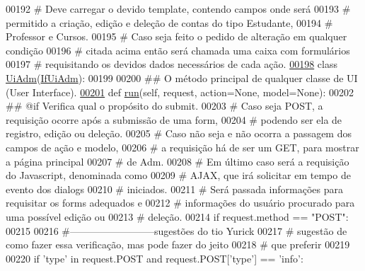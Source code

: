 \begin{DoxyCode}
00192 \textcolor{comment}{#   Deve carregar o devido template, contendo campos onde será}
00193 \textcolor{comment}{#   permitido a criação, edição e deleção de contas do tipo Estudante,}
00194 \textcolor{comment}{#   Professor e Cursos.}
00195 \textcolor{comment}{#   Caso seja feito o pedido de alteração em qualquer condição}
00196 \textcolor{comment}{#   citada acima então será chamada uma caixa com formulários}
00197 \textcolor{comment}{#   requisitando os devidos dados necessários de cada ação.}
\hypertarget{AdmUnit_8py_source_l00198}{}\hyperlink{classAdm_1_1AdmUnit_1_1UiAdm}{00198} \textcolor{keyword}{class }\hyperlink{classAdm_1_1AdmUnit_1_1UiAdm}{UiAdm}(\hyperlink{classAdm_1_1AdmUnit_1_1IfUiAdm}{IfUiAdm}): 
00199 
00200     \textcolor{comment}{## O método principal de qualquer classe de UI (User Interface).}
\hypertarget{AdmUnit_8py_source_l00201}{}\hyperlink{classAdm_1_1AdmUnit_1_1UiAdm_a88df3b19b48d71b2c0fc0b4557c71416}{00201}     \textcolor{keyword}{def }\hyperlink{classAdm_1_1AdmUnit_1_1UiAdm_a88df3b19b48d71b2c0fc0b4557c71416}{run}(self, request, action=None, model=None):
00202         \textcolor{comment}{## @if Verifica qual o propósito do submit.}
00203         \textcolor{comment}{#   Caso seja POST, a requisição ocorre após a submissão de uma form,}
00204         \textcolor{comment}{#       podendo ser ela de registro, edição ou deleção.}
00205         \textcolor{comment}{#   Caso não seja e não ocorra a passagem dos campos de ação e modelo,}
00206         \textcolor{comment}{#       a requisição há de ser um GET, para mostrar a página principal}
00207         \textcolor{comment}{#       de Adm.}
00208         \textcolor{comment}{#   Em último caso será a requisição do Javascript, denominada como }
00209         \textcolor{comment}{#       AJAX, que irá solicitar em tempo de evento dos dialogs }
00210         \textcolor{comment}{#       iniciados.}
00211         \textcolor{comment}{#   Será passada informações para requisitar os forms adequados e }
00212         \textcolor{comment}{#       informações do usuário procurado para uma possível edição ou }
00213         \textcolor{comment}{#       deleção.}
00214         \textcolor{keywordflow}{if} request.method == \textcolor{stringliteral}{"POST"}:
00215 
00216             \textcolor{comment}{#--------------------------sugestões do tio Yurick}
00217             \textcolor{comment}{# sugestão de como fazer essa verificação, mas pode fazer do jeito}
00218             \textcolor{comment}{# que preferir}
00219 
00220             \textcolor{keywordflow}{if} \textcolor{stringliteral}{'type'} \textcolor{keywordflow}{in} request.POST \textcolor{keywordflow}{and} request.POST[\textcolor{stringliteral}{'type'}] == \textcolor{stringliteral}{'info'}:

\end{DoxyCode}
